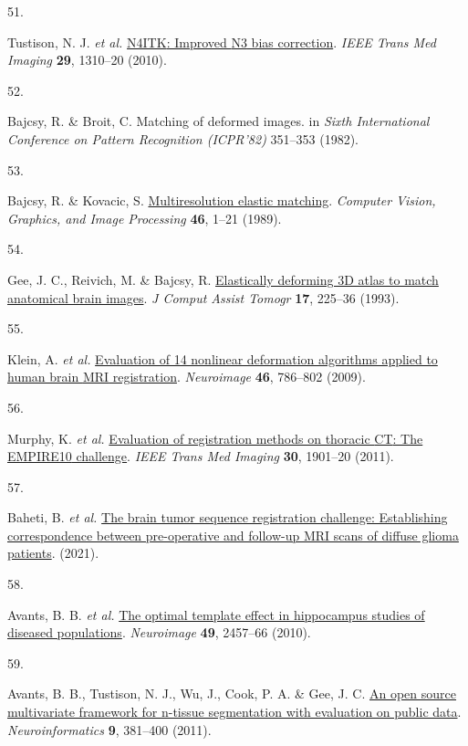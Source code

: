 \documentclass[
  12pt,
]{article}
\newlength{\cslhangindent}
\newlength{\csllabelwidth}
\newenvironment{CSLReferences}[2] %
 {\begin{list}{}{%
  \setlength{\itemindent}{0pt}
  \setlength{\leftmargin}{0pt}
  \setlength{\parsep}{0pt}
  \ifodd #1
   \setlength{\leftmargin}{\cslhangindent}
   \setlength{\itemindent}{-1\cslhangindent}
  \fi
  \setlength{\itemsep}{#2\baselineskip}}}
 {\end{list}}
\newcommand{\CSLLeftMargin}[1]{\parbox[t]{\csllabelwidth}{\strut#1\strut}}
\newcommand{\CSLRightInline}[1]{\parbox[t]{\linewidth - \csllabelwidth}{\strut#1\strut}}
\begin{document}
\begin{CSLReferences}{0}{0}
\CSLLeftMargin{51. }%
\CSLRightInline{Tustison, N. J. \emph{et al.}
\href{https://doi.org/10.1109/TMI.2010.2046908}{{N4ITK}: Improved {N3}
bias correction}. \emph{IEEE Trans Med Imaging} \textbf{29}, 1310--20
(2010).}

\CSLLeftMargin{52. }%
\CSLRightInline{Bajcsy, R. \& Broit, C. Matching of deformed images. in
\emph{{S}ixth {I}nternational {C}onference on {P}attern {R}ecognition
({ICPR}'82)} 351--353 (1982).}

\CSLLeftMargin{53. }%
\CSLRightInline{Bajcsy, R. \& Kovacic, S.
\href{https://doi.org/10.1016/S0734-189X(89)80014-3}{Multiresolution
elastic matching}. \emph{Computer Vision, Graphics, and Image
Processing} \textbf{46}, 1--21 (1989).}

\CSLLeftMargin{54. }%
\CSLRightInline{Gee, J. C., Reivich, M. \& Bajcsy, R.
\href{https://www.ncbi.nlm.nih.gov/pubmed/8454749}{Elastically deforming
3D atlas to match anatomical brain images}. \emph{J Comput Assist
Tomogr} \textbf{17}, 225--36 (1993).}

\CSLLeftMargin{55. }%
\CSLRightInline{Klein, A. \emph{et al.}
\href{https://doi.org/10.1016/j.neuroimage.2008.12.037}{Evaluation of 14
nonlinear deformation algorithms applied to human brain {MRI}
registration}. \emph{Neuroimage} \textbf{46}, 786--802 (2009).}

\CSLLeftMargin{56. }%
\CSLRightInline{Murphy, K. \emph{et al.}
\href{https://doi.org/10.1109/TMI.2011.2158349}{Evaluation of
registration methods on thoracic {CT}: The {EMPIRE10} challenge}.
\emph{IEEE Trans Med Imaging} \textbf{30}, 1901--20 (2011).}

\CSLLeftMargin{57. }%
\CSLRightInline{Baheti, B. \emph{et al.}
\href{https://arxiv.org/abs/2112.06979}{The brain tumor sequence
registration challenge: Establishing correspondence between
pre-operative and follow-up MRI scans of diffuse glioma patients}.
(2021).}

\CSLLeftMargin{58. }%
\CSLRightInline{Avants, B. B. \emph{et al.}
\href{https://doi.org/10.1016/j.neuroimage.2009.09.062}{The optimal
template effect in hippocampus studies of diseased populations}.
\emph{Neuroimage} \textbf{49}, 2457--66 (2010).}

\CSLLeftMargin{59. }%
\CSLRightInline{Avants, B. B., Tustison, N. J., Wu, J., Cook, P. A. \&
Gee, J. C. \href{https://doi.org/10.1007/s12021-011-9109-y}{An open
source multivariate framework for n-tissue segmentation with evaluation
on public data}. \emph{Neuroinformatics} \textbf{9}, 381--400 (2011).}


\end{CSLReferences}
\end{document}
